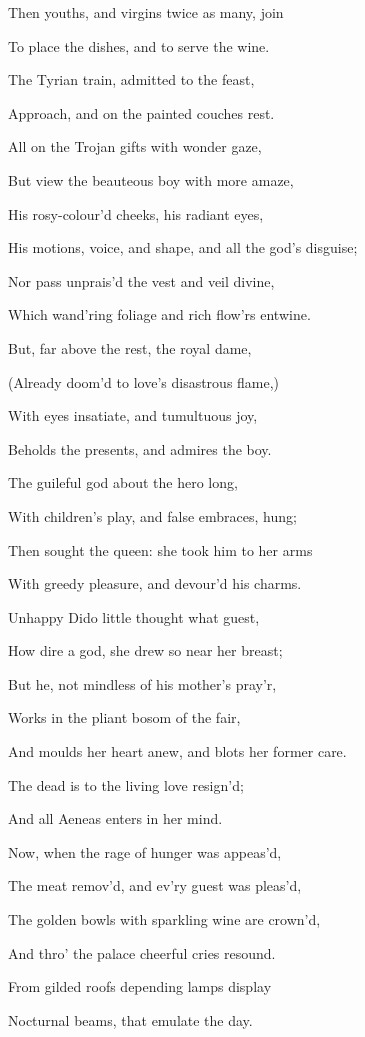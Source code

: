Then youths, and virgins twice as many, join

To place the dishes, and to serve the wine.

The Tyrian train, admitted to the feast,

Approach, and on the painted couches rest.

All on the Trojan gifts with wonder gaze,

But view the beauteous boy with more amaze,

His rosy-colour’d cheeks, his radiant eyes,

His motions, voice, and shape, and all the god’s disguise;

Nor pass unprais’d the vest and veil divine,

Which wand’ring foliage and rich flow’rs entwine.

But, far above the rest, the royal dame,

(Already doom’d to love’s disastrous flame,)

With eyes insatiate, and tumultuous joy,

Beholds the presents, and admires the boy.

The guileful god about the hero long,

With children’s play, and false embraces, hung;

Then sought the queen: she took him to her arms

With greedy pleasure, and devour’d his charms.

Unhappy Dido little thought what guest,

How dire a god, she drew so near her breast;

But he, not mindless of his mother’s pray’r,

Works in the pliant bosom of the fair,

And moulds her heart anew, and blots her former care.

The dead is to the living love resign’d;

And all Aeneas enters in her mind.

Now, when the rage of hunger was appeas’d,

The meat remov’d, and ev’ry guest was pleas’d,

The golden bowls with sparkling wine are crown’d,

And thro’ the palace cheerful cries resound.

From gilded roofs depending lamps display

Nocturnal beams, that emulate the day.

